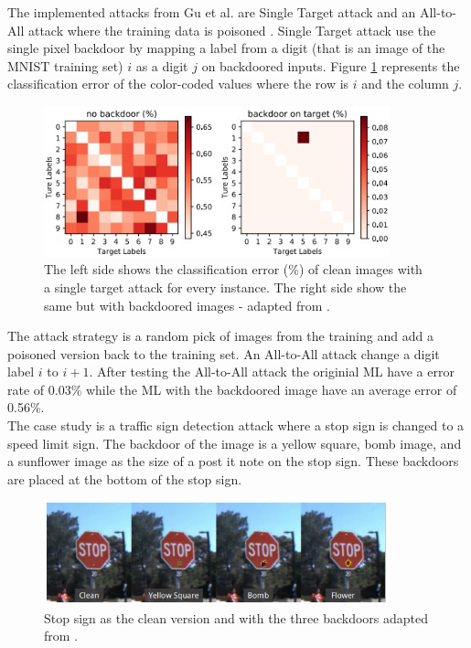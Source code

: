 The implemented attacks from Gu et al. are Single Target attack and an All-to-All attack where the training data is poisoned \cite{DBLP:conf/ccs/HuangJNRT11}. Single Target attack use the single pixel backdoor by mapping a label from a digit (that is an image of the MNIST \cite{LeCun1995LearningAF} training set) $i$ as a digit $j$ on backdoored inputs. Figure \ref{fig:mapped_from_i_to_j} represents the classification error of the color-coded values where the row is $i$ and the column $j$.

\begin{figure}[ht!]
  \centering
  \includegraphics[width=10cm]{pictures/mapping_from_i_to_j.jpg}
  \caption{The left side shows the classification error (\%) of clean images with a single target attack for every instance. The right side show the same but with backdoored images - adapted from \cite{DBLP:journals/corr/abs-1708-06733}.}
  \label{fig:mapped_from_i_to_j}
\end{figure}

The attack strategy is a random pick of images from the training and add a poisoned version back to the training set. An All-to-All attack change a digit label $i$ to $i + 1$. After testing the All-to-All attack the originial ML have a error rate of 0.03\% while the ML with the backdoored image have an average error of 0.56\%. \\ The case study is a traffic sign detection attack where a stop sign is changed to a speed limit sign. The backdoor of the image is a yellow square, bomb image, and a sunflower image as the size of a post it note on the stop sign. These backdoors are placed at the bottom of the stop sign.

\begin{figure}[ht!]
  \centering
  \includegraphics[width=10cm]{pictures/stop_sign.jpg}
  \caption{Stop sign as the clean version and with the three backdoors adapted from \cite{DBLP:journals/corr/abs-1708-06733}.}
  \label{fig:stop_sign}
\end{figure}

